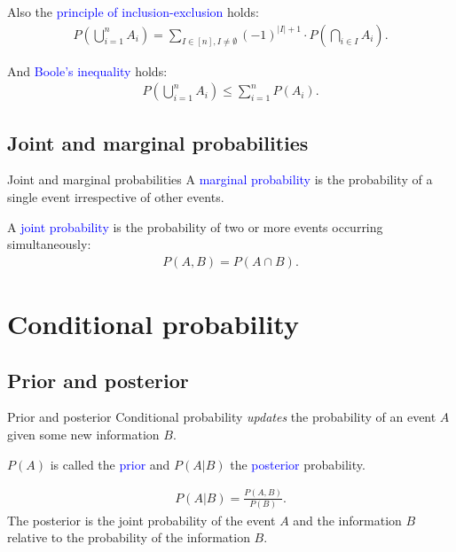 \documentclass{beamer}
\def\padding{\vspace{0.5cm}}
\def\spadding{\vspace{0.25cm}}
\def\b{\textcolor{blue}}
\begin{document}
\begin{frame}
    Also the \b{principle of inclusion-exclusion} holds:
    \begin{align*}
        P(\bigcup_{i=1}^n A_i) = \sum_{I \in [n], I \neq \emptyset} (-1)^{|I| + 1} \cdot P(\bigcap_{i \in I} A_i).
    \end{align*}\pause\par\padding
    And \b{Boole's inequality} holds:
    \begin{align*}
        P(\bigcup_{i=1}^n A_i) \leq \sum_{i=1}^n P(A_i).
    \end{align*}
\end{frame}

\subsection{Joint and marginal probabilities}
\begin{frame}{Joint and marginal probabilities}
    A \b{marginal probability} is the probability of a single event irrespective of other events.\pause\par\spadding
    A \b{joint probability} is the probability of two or more events occurring simultaneously:
    \begin{align*}
        P(A,B) = P(A \cap B).
    \end{align*}
\end{frame}

\section{Conditional probability}
\subsection{Prior and posterior}
\begin{frame}{Prior and posterior}
    Conditional probability \textit{updates} the probability of an event $A$ given some new information $B$.\pause\par\padding
    $P(A)$ is called the \b{prior} and $P(A|B)$ the \b{posterior} probability.\pause\par\padding
    \begin{align*}
        P(A|B) = \frac{P(A,B)}{P(B)}.
    \end{align*}
    The posterior is the joint probability of the event $A$ and the information $B$ relative to the probability of the information $B$.
\end{frame}
\end{document}
